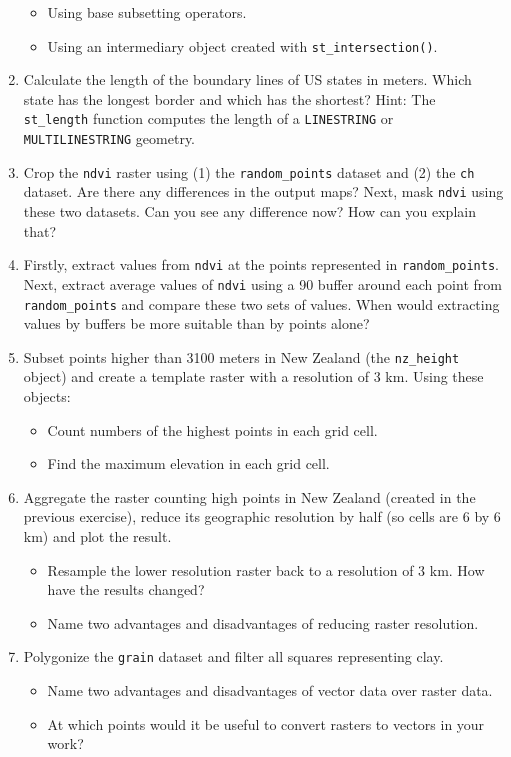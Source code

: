 \documentclass[]{krantz}
\providecommand{\tightlist}{%
  \setlength{\itemsep}{0pt}\setlength{\parskip}{0pt}}
\begin{document}
\begin{enumerate}
  \begin{itemize}
  \tightlist
  \item
    Using base subsetting operators.
  \item
    Using an intermediary object created with \texttt{st\_intersection()}.
  \end{itemize}
\item
  Calculate the length of the boundary lines of US states in meters.
  Which state has the longest border and which has the shortest?
  Hint: The \texttt{st\_length} function computes the length of a \texttt{LINESTRING} or \texttt{MULTILINESTRING} geometry.
\item
  Crop the \texttt{ndvi} raster using (1) the \texttt{random\_points} dataset and (2) the \texttt{ch} dataset.
  Are there any differences in the output maps?
  Next, mask \texttt{ndvi} using these two datasets.
  Can you see any difference now?
  How can you explain that?
\item
  Firstly, extract values from \texttt{ndvi} at the points represented in \texttt{random\_points}.
  Next, extract average values of \texttt{ndvi} using a 90 buffer around each point from \texttt{random\_points} and compare these two sets of values.
  When would extracting values by buffers be more suitable than by points alone?
\item
  Subset points higher than 3100 meters in New Zealand (the \texttt{nz\_height} object) and create a template raster with a resolution of 3 km.
  Using these objects:

  \begin{itemize}
  \tightlist
  \item
    Count numbers of the highest points in each grid cell.
  \item
    Find the maximum elevation in each grid cell.
  \end{itemize}
\item
  Aggregate the raster counting high points in New Zealand (created in the previous exercise), reduce its geographic resolution by half (so cells are 6 by 6 km) and plot the result.

  \begin{itemize}
  \tightlist
  \item
    Resample the lower resolution raster back to a resolution of 3 km. How have the results changed?
  \item
    Name two advantages and disadvantages of reducing raster resolution.
  \end{itemize}
\item
  Polygonize the \texttt{grain} dataset and filter all squares representing clay.

  \begin{itemize}
  \tightlist
  \item
    Name two advantages and disadvantages of vector data over raster data.
  \item
    At which points would it be useful to convert rasters to vectors in your work?
  \end{itemize}
\end{enumerate}
\end{document}
